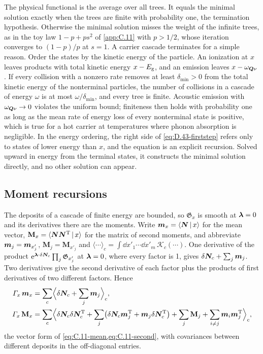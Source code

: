 The physical functional is the average over all trees. It equals the minimal solution exactly when the trees are finite with probability one, the termination hypothesis. Otherwise the minimal solution misses the weight of the infinite trees, as in the toy law $1 - p + ps^2$ of \cref{app:C.11} with $p > 1/2$, whose iteration converges to $(1 - p)/p$ at $s = 1$. A carrier cascade terminates for a simple reason. Order the states by the kinetic energy of the particle. An ionization at $x$ leaves products with total kinetic energy $x - E_{\mathrm{g}}$, and an emission leaves $x - \omega_{\bm{Q}\nu}$. If every collision with a nonzero rate removes at least $\delta_{\min} > 0$ from the total kinetic energy of the nonterminal particles, the number of collisions in a cascade of energy $\omega$ is at most $\omega/\delta_{\min}$, and every tree is finite. Acoustic emission with $\omega_{\bm{Q}\nu} \to 0$ violates the uniform bound; finiteness then holds with probability one as long as the mean rate of energy loss of every nonterminal state is positive, which is true for a hot carrier at temperatures where phonon absorption is negligible. In the energy ordering, the right side of \cref{eq:D.43-firststep} refers only to states of lower energy than $x$, and the equation is an explicit recursion. Solved upward in energy from the terminal states, it constructs the minimal solution directly, and no other solution can appear.

\subsection{Moment recursions}

The deposits of a cascade of finite energy are bounded, so $\mathfrak{G}_x$ is smooth at $\bm{\lambda} = 0$ and its derivatives there are the moments. Write $\bm{m}_x = \langle\bm{N}\,|\,x\rangle$ for the mean vector, $\mathbf{M}_x = \langle\bm{N}\bm{N}^{\mathrm{T}}\,|\,x\rangle$ for the matrix of second moments, and abbreviate $\bm{m}_j = \bm{m}_{x'_j}$, $\mathbf{M}_j = \mathbf{M}_{x'_j}$ and $\langle\cdots\rangle_c = \int\dd x'_1\cdots\dd x'_m\,\mathscr{K}_c(\cdots)$. One derivative of the product $\mathrm{e}^{\bm{\lambda}\cdot\delta\bm{N}_c}\prod_j\mathfrak{G}_{x'_j}$ at $\bm{\lambda} = 0$, where every factor is 1, gives $\delta\bm{N}_c + \sum_j\bm{m}_j$. Two derivatives give the second derivative of each factor plus the products of first derivatives of two different factors. Hence
\begin{align}
  \varGamma_x\,\bm{m}_x &= \sum_c\Bigl\langle\delta\bm{N}_c + \sum_j\bm{m}_j\Bigr\rangle_c ,
  \label{eq:D.43-mean}\\
  \varGamma_x\,\mathbf{M}_x &= \sum_c\Bigl\langle\delta\bm{N}_c\delta\bm{N}_c^{\mathrm{T}} + \sum_j\bigl(\delta\bm{N}_c\bm{m}_j^{\mathrm{T}} + \bm{m}_j\delta\bm{N}_c^{\mathrm{T}}\bigr) + \sum_j\mathbf{M}_j + \sum_{i\neq j}\bm{m}_i\bm{m}_j^{\mathrm{T}}\Bigr\rangle_c ,
  \label{eq:D.43-second}
\end{align}
the vector form of \cref{eq:C.11-mean,eq:C.11-second}, with covariances between different deposits in the off-diagonal entries.

